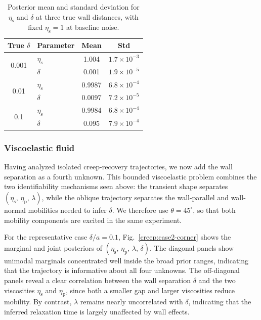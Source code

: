 \documentclass{elsarticle}
\begin{document}
\begin{table}[!ht]
\centering
\begin{tabular}{c l cc}
\toprule
True $\delta$ & Parameter & Mean & Std \\
\midrule
\multirow{2}{*}{0.001}
 & $\eta_{\mathrm{s}}$ & 1.004 & $1.7\times 10^{-3}$ \\
 & $\delta$            & 0.001 & $1.9\times 10^{-5}$ \\
\midrule
\multirow{2}{*}{0.01}
 & $\eta_{\mathrm{s}}$ & 0.9987 & $6.8\times 10^{-4}$ \\
 & $\delta$            & 0.0097 & $7.2\times 10^{-5}$ \\
\midrule
\multirow{2}{*}{0.1}
 & $\eta_{\mathrm{s}}$ & 0.9984 & $6.8\times 10^{-4}$ \\
 & $\delta$            & 0.095  & $7.9\times 10^{-4}$ \\
\bottomrule
\end{tabular}
\caption{Posterior mean and standard deviation for $\eta_{\mathrm{s}}$
         and $\delta$ at three true wall distances, with fixed
         $\eta_{\mathrm{s}} = 1$ at baseline noise.}
\label{delta-newtonian}
\end{table}

\FloatBarrier

\subsubsection{Viscoelastic fluid}

Having analyzed isolated creep-recovery trajectories, we now add the wall
separation as a fourth unknown. This bounded viscoelastic problem
combines the two identifiability mechanisms seen above: the transient
shape separates $(\eta_{\mathrm{s}},\,\eta_{\mathrm{p}},\,\lambda)$, while
the oblique trajectory separates the wall-parallel and wall-normal
mobilities needed to infer $\delta$. We therefore use $\theta=45^{\circ}$,
so that both mobility components are excited in the same experiment.

For the representative case $\delta/a = 0.1$,
Fig.~\ref{creep:case2-corner} shows the marginal and joint posteriors of
$(\eta_{\mathrm{s}},\,\eta_{\mathrm{p}},\,\lambda,\,\delta)$. The diagonal
panels show unimodal marginals concentrated well inside the broad prior
ranges, indicating that the trajectory is informative about all four
unknowns. The off-diagonal panels reveal a clear correlation between the
wall separation $\delta$ and the two viscosities $\eta_{\mathrm{s}}$ and
$\eta_{\mathrm{p}}$, since both a smaller gap and larger viscosities
reduce mobility. By contrast, $\lambda$ remains nearly uncorrelated with
$\delta$, indicating that the inferred relaxation time is largely
unaffected by wall effects.
\end{document}

